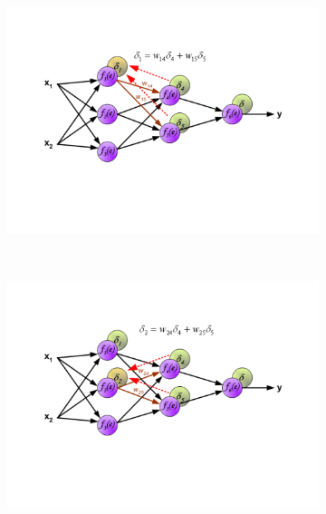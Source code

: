 \documentclass[a4paper,12pt]{report}
\begin{document}
\begin{figure}[h!]
\begin{subfigure}[b]{0.45\linewidth}
  \end{subfigure}
  \begin{subfigure}[b]{0.45\linewidth}
   \includegraphics[width=\linewidth]{BackPropd.png}
  \end{subfigure}
  \\
  \begin{subfigure}[b]{0.45\linewidth}
   \includegraphics[width=\linewidth]{BackPrope.png}
  \end{subfigure}
  \begin{subfigure}[b]{0.45\linewidth}

\end{subfigure}
\end{figure}
\end{document}
